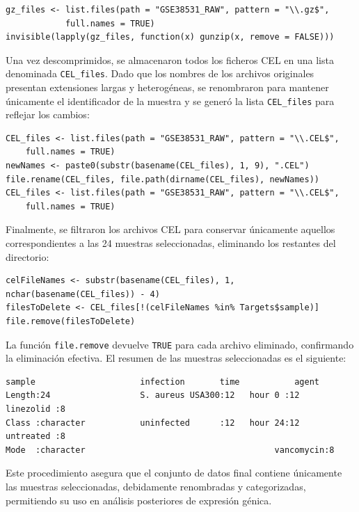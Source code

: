 \documentclass[12pt,a4paper]{article}
\begin{document}
\begin{verbatim}
gz_files <- list.files(path = "GSE38531_RAW", pattern = "\\.gz$", 
            full.names = TRUE)
invisible(lapply(gz_files, function(x) gunzip(x, remove = FALSE)))
\end{verbatim}

Una vez descomprimidos, se almacenaron todos los ficheros CEL en una lista denominada \texttt{CEL\_files}. Dado que los nombres de los archivos originales presentan extensiones largas y heterogéneas, se renombraron para mantener únicamente el identificador de la muestra y se generó la lista \texttt{CEL\_files} para reflejar los cambios:

\begin{verbatim}
CEL_files <- list.files(path = "GSE38531_RAW", pattern = "\\.CEL$", 
    full.names = TRUE)
newNames <- paste0(substr(basename(CEL_files), 1, 9), ".CEL")
file.rename(CEL_files, file.path(dirname(CEL_files), newNames))
CEL_files <- list.files(path = "GSE38531_RAW", pattern = "\\.CEL$", 
    full.names = TRUE)
\end{verbatim}

Finalmente, se filtraron los archivos CEL para conservar únicamente aquellos correspondientes a las 24 muestras seleccionadas, eliminando los restantes del directorio:

\begin{verbatim}
celFileNames <- substr(basename(CEL_files), 1, nchar(basename(CEL_files)) - 4)
filesToDelete <- CEL_files[!(celFileNames %in% Targets$sample)]
file.remove(filesToDelete)
\end{verbatim}

La función \texttt{file.remove} devuelve \texttt{TRUE} para cada archivo eliminado, confirmando la eliminación efectiva. El resumen de las muestras seleccionadas es el siguiente:

\begin{verbatim}
sample                     infection       time           agent  
Length:24                  S. aureus USA300:12   hour 0 :12   linezolid :8  
Class :character           uninfected      :12   hour 24:12   untreated :8  
Mode  :character                                      vancomycin:8 
\end{verbatim}

Este procedimiento asegura que el conjunto de datos final contiene únicamente las muestras seleccionadas, debidamente renombradas y categorizadas, permitiendo su uso en análisis posteriores de expresión génica.
\end{document}

